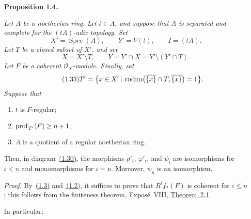\noindent\textbf{Proposition 1.4.}\quad
{\itshape Let $A$ be a noetherian ring. Let $t\in A$, and suppose that $A$ is
separated and complete for the $(tA)$-adic topology. Set
\begin{equation}
\tag{1.31}\label{eq:IX.1.31}
X'=\operatorname{Spec}(A),\qquad Y'=V(t),\qquad I=(tA).
\end{equation}
Let $T$ be a closed subset of $X'$, and set
\begin{equation}
\tag{1.32}\label{eq:IX.1.32}
X=X'\setminus T,\qquad
Y=Y'\cap X=Y'\setminus(Y'\cap T).
\end{equation}
Let $F$ be a coherent $\mathcal O_X$-module. Finally, set
\begin{equation}
\tag{1.33}\label{eq:IX.1.33}
T'=\bigl\{x\in X'\mid
\operatorname{codim}\bigl(\overline{\{x\}}\cap T,\overline{\{x\}}\bigr)=1\bigr\}.
\end{equation}
Suppose that
\begin{enumerate}
\renewcommand{\labelenumi}{\alph{enumi})}
\item $t$ is $F$-regular;
\item $\operatorname{prof}_{T'}(F)\ge n+1$;
\item $A$ is a quotient of a regular noetherian ring.
\end{enumerate}
Then, in diagram~\hyperref[eq:IX.1.30]{(1.30)}, the morphisms $\rho'_i$, $\varphi'_i$, and $\psi_i$
are isomorphisms for $i<n$ and monomorphisms for $i=n$. Moreover, $\psi_n$
is an isomorphism.}

\medskip
{}

\noindent\emph{Proof.}\quad
By~\hyperref[eq:IX.1.3]{(1.3)} and~\hyperref[eq:IX.1.2]{(1.2)}, it suffices to prove that $R^i f_*(F)$ is coherent for
$i\le n$; this follows from the finiteness theorem, Expos\'e~VIII,
\hyperref[IX.2.1]{Theorem~2.1}.

\medskip
\noindent In particular:

